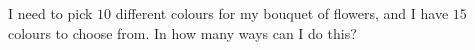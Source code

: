 I need to pick $10$ different colours for my bouquet of flowers, and I have $15$ colours to choose from. In how many ways can I do this?
